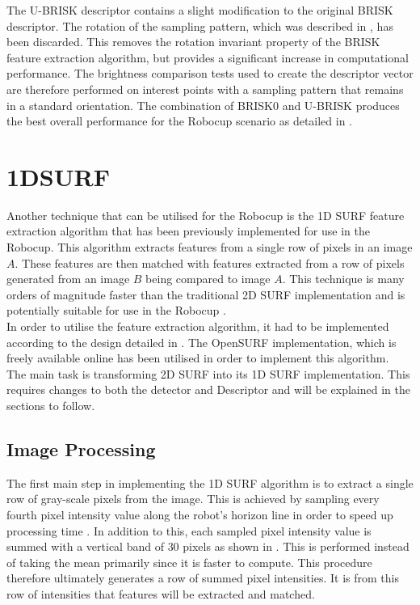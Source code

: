 \documentclass[11pt]{report}
\begin{document}
The U-BRISK descriptor contains a slight modification to the original BRISK descriptor. The rotation of the sampling pattern, which was described in , has been discarded. This removes the rotation invariant property of the BRISK feature extraction algorithm, but provides a significant increase in computational performance. The brightness comparison tests used to create the descriptor vector are therefore performed on interest points with a sampling pattern that remains in a standard orientation. The combination of BRISK0 and U-BRISK produces the best overall performance for the Robocup scenario as detailed in . \\

\section{1DSURF}
\label{sec:1dsurf}
Another technique that can be utilised for the Robocup is the 1D SURF feature extraction algorithm that has been previously implemented \cite{Anderson} for use in the Robocup. This algorithm extracts features from a single row of pixels in an image $A$. These features are then matched with features extracted from a row of pixels generated from an image $B$ being compared to image $A$. This technique is many orders of magnitude faster than the traditional 2D SURF implementation and is potentially suitable for use in the Robocup \cite{Anderson}.\\

In order to utilise the feature extraction algorithm, it had to be implemented according to the design detailed in \cite{Anderson}. The OpenSURF implementation, which is freely available online \cite{opensurf} has been utilised in order to implement this algorithm.\\

The main task is transforming 2D SURF into its 1D SURF implementation. This requires changes to both the detector and Descriptor and will be explained in the sections to follow.\\

\subsection{Image Processing}
\label{sec:imageProcessing}
The first main step in implementing the 1D SURF algorithm is to extract a single row of gray-scale pixels from the image. This is achieved by sampling every fourth pixel intensity value along the robot's horizon line in order to speed up processing time \cite{Anderson}. 
In addition to this, each sampled pixel intensity value is summed with a vertical band of $30$ pixels as shown in . This is performed instead of taking the mean primarily since it is faster to compute. This procedure therefore ultimately generates a row of summed pixel intensities. It is from this row of intensities that features will be extracted and matched.\\
\end{document}
